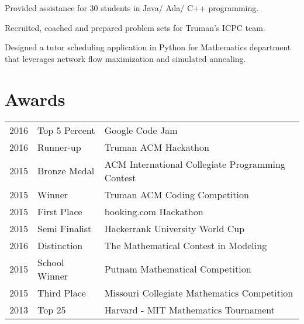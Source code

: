 \documentclass[letterpaper]{deedy-resume} %
\begin{document}
\begin{minipage}[t]{0.66\textwidth}
\sectionspace %



\begin{tightitemize}
\item Provided assistance for 30 students in Java/ Ada/ C++ programming. 
\item Recruited, coached and prepared problem sets for Truman's ICPC team.
\item Designed a tutor scheduling application in Python for Mathematics department that leverages network flow maximization and simulated annealing.
\end{tightitemize}

\sectionspace %

\section{Awards} 

\begin{tabular}{rll}
2016 & Top 5 Percent & Google Code Jam\\
2016 & Runner-up & Truman ACM Hackathon\\
2015 & Bronze Medal & ACM International Collegiate Programming Contest\\
2015 & Winner & Truman ACM Coding Competition\\
2015 & First Place & booking.com Hackathon \\
2015 & Semi Finalist & Hackerrank University World Cup\\
2016 & Distinction & The Mathematical Contest in Modeling \\
2015 & School Winner & Putnam Mathematical Competition\\
2015 & Third Place & Missouri Collegiate Mathematics Competition \\
2013 & Top 25 & Harvard - MIT Mathematics Tournament
\end{tabular}

\sectionspace %


\end{minipage}
\end{document}
